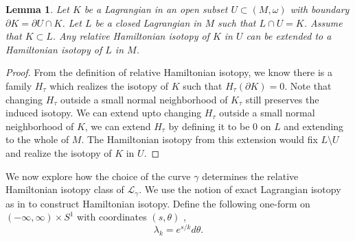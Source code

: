 \documentclass[11pt, oneside,dvipsnames]{amsart}
\newcommand{\sub}{\subset}
\newcommand{\<}{\langle}
\renewcommand{\>}{\rangle}
\newcommand{\cL}{\mathcal{L}}
\newtheorem{lemma}[Theorem]{Lemma}
\theoremstyle{definition}
\theoremstyle{definition}
\numberwithin{equation}{subsection}
\begin{document}
\begin{lemma}
    Let $K$ be a Lagrangian in an open subset $U \sub (M,\omega)$ with boundary $\partial K = \partial U \cap K$. Let $L$ be a closed Lagrangian in $M$ such that $L \cap U = K$. Assume that $K \sub L$. Any relative Hamiltonian isotopy of $K$ in $U$ can be extended to a Hamiltonian isotopy of $L$ in $M$.
\end{lemma}
\begin{proof}
    From the definition of relative Hamiltonian isotopy, we know there is a family $H_\tau$ which realizes the isotopy of $K$ such that $H_\tau (\partial K) = 0.$ Note that changing $H_\tau$ outside a small normal neighborhood of $K_\tau$ still preserves the induced isotopy. We can extend  upto changing $H_\tau$ outside a small normal neighborhood of $K$, we can extend $H_\tau$ by defining it to be $0$ on $L$ and extending to the whole of $M$. The Hamiltonian isotopy from this extension would fix $L\setminus U$ and realize the isotopy of $K$ in $U.$
\end{proof}





We now explore how the choice of the curve $\gamma$ determines the relative Hamiltonian isotopy class of $\cL_\gamma$. We use the notion of exact Lagrangian isotopy as in \cite[\S~6.1]{pol01} to construct Hamiltonian isotopy. Define the following one-form on $(-\infty,\infty) \times S^1$ with coordinates $(s,\theta)$  , $$\lambda_k = e^{s/k} d\theta.$$ 
\end{document}
